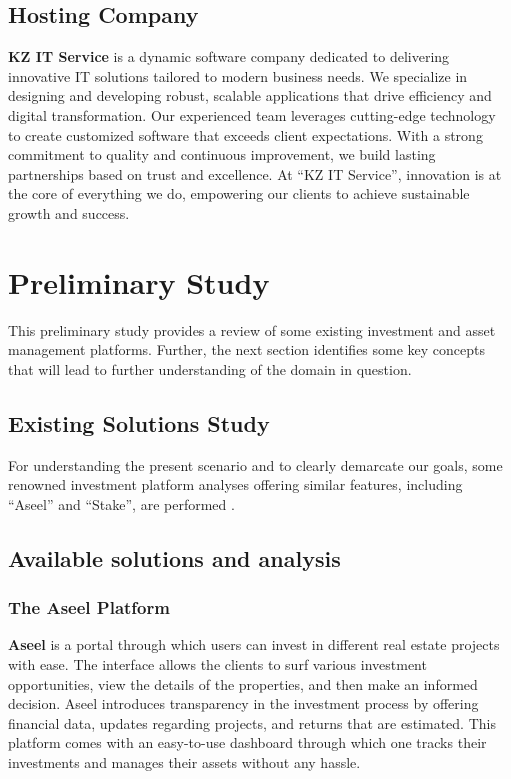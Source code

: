 \subsection{Hosting Company}

\textbf{\textcolor{primary}{KZ IT Service}} is a dynamic software company dedicated to delivering innovative IT solutions tailored to modern business needs. We specialize in designing and developing robust, scalable applications that drive efficiency and digital transformation. Our experienced team leverages cutting-edge technology to create customized software that exceeds client expectations. With a strong commitment to quality and continuous improvement, we build lasting partnerships based on trust and excellence. At ``KZ IT Service'', innovation is at the core of everything we do, empowering our clients to achieve sustainable growth and success.

\section{Preliminary Study}

This preliminary study provides a review of some existing investment and asset management platforms. Further, the next section identifies some key concepts that will lead to further understanding of the domain in question.

\subsection{Existing Solutions Study}

For understanding the present scenario and to clearly demarcate our goals, some renowned investment platform analyses offering similar features, including ``Aseel'' and ``Stake'', are performed \cite{G2CompetitiveAnalysis2024, AsanaCompetitiveAnalysis2024}.

\subsection{Available solutions and analysis}

\subsubsection{The Aseel Platform}

\textbf{\textcolor{primary}{Aseel}} is a portal through which users can invest in different real estate projects with ease. The interface allows the clients to surf various investment opportunities, view the details of the properties, and then make an informed decision. Aseel introduces transparency in the investment process by offering financial data, updates regarding projects, and returns that are estimated. This platform comes with an easy-to-use dashboard through which one tracks their investments and manages their assets without any hassle.

